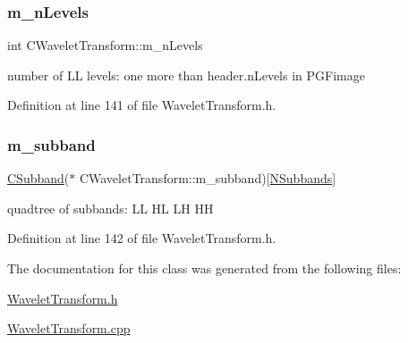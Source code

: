 \subsubsection{\texorpdfstring{m\_nLevels}{m\_nLevels}}
{\footnotesize\ttfamily int C\+Wavelet\+Transform\+::m\+\_\+n\+Levels\hspace{0.3cm}{\ttfamily [private]}}



number of LL levels\+: one more than header.\+n\+Levels in P\+G\+Fimage 



Definition at line 141 of file Wavelet\+Transform.\+h.

\mbox{\label{classCWaveletTransform_a0116d5d57b09e2c9f19776531dbc20f7}} 
\subsubsection{\texorpdfstring{m\_subband}{m\_subband}}
{\footnotesize\ttfamily \mbox{\hyperlink{classCSubband}{C\+Subband}}($\ast$ C\+Wavelet\+Transform\+::m\+\_\+subband)\mbox{[}\mbox{\hyperlink{PGFtypes_8h_a0cf7b93e79e7ebfc148bc9dff30d8cd1}{N\+Subbands}}\mbox{]}\hspace{0.3cm}{\ttfamily [private]}}



quadtree of subbands\+: LL HL LH HH 



Definition at line 142 of file Wavelet\+Transform.\+h.



The documentation for this class was generated from the following files\+:\begin{DoxyCompactItemize}
\item 
\mbox{\hyperlink{WaveletTransform_8h}{Wavelet\+Transform.\+h}}\item 
\mbox{\hyperlink{WaveletTransform_8cpp}{Wavelet\+Transform.\+cpp}}\end{DoxyCompactItemize}
